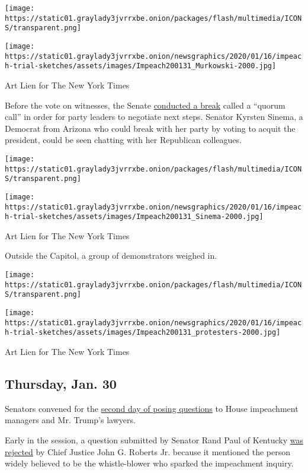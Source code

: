 \texttt{[image: https://static01.graylady3jvrrxbe.onion/packages/flash/multimedia/ICONS/transparent.png]}

\texttt{[image: https://static01.graylady3jvrrxbe.onion/newsgraphics/2020/01/16/impeach-trial-sketches/assets/images/Impeach200131\_Murkowski-2000.jpg]}

Art Lien for The New York Times

Before the vote on witnesses, the Senate
\href{https://www.nytimes3xbfgragh.onion/live/2020/trump-impeachment-trial-01-31?action=click\&module=Spotlight\&pgtype=Homepage\#senate-leadership-negotiates}{conducted
a break} called a ``quorum call'' in order for party leaders to
negotiate next steps. Senator Kyrsten Sinema, a Democrat from Arizona
who could break with her party by voting to acquit the president, could
be seen chatting with her Republican colleagues.

\texttt{[image: https://static01.graylady3jvrrxbe.onion/packages/flash/multimedia/ICONS/transparent.png]}

\texttt{[image: https://static01.graylady3jvrrxbe.onion/newsgraphics/2020/01/16/impeach-trial-sketches/assets/images/Impeach200131\_Sinema-2000.jpg]}

Art Lien for The New York Times

Outside the Capitol, a group of demonstrators weighed in.

\texttt{[image: https://static01.graylady3jvrrxbe.onion/packages/flash/multimedia/ICONS/transparent.png]}

\texttt{[image: https://static01.graylady3jvrrxbe.onion/newsgraphics/2020/01/16/impeach-trial-sketches/assets/images/Impeach200131\_protesters-2000.jpg]}

Art Lien for The New York Times

\hypertarget{thursday-jan-30}{%
\subsection{Thursday, Jan. 30}\label{thursday-jan-30}}

Senators convened for the
\href{https://www.nytimes3xbfgragh.onion/live/2020/trump-impeachment-trial-01-30}{second
day of posing questions} to House impeachment managers and Mr. Trump's
lawyers.

Early in the session, a question submitted by Senator Rand Paul of
Kentucky
\href{https://www.nytimes3xbfgragh.onion/live/2020/trump-impeachment-trial-01-30?action=click\&module=Top\%20Stories\&pgtype=Homepage\#chief-justice-declines-a-question-from-rand-paul-that-could-have-identified-the-whistle-blower}{was
rejected} by Chief Justice John G. Roberts Jr. because it mentioned the
person widely believed to be the whistle-blower who sparked the
impeachment inquiry.

